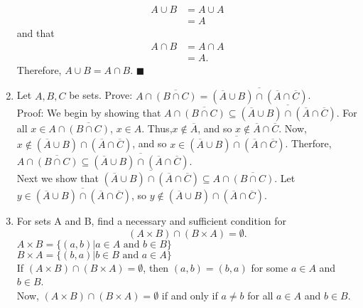 \documentclass[12pt]{article}
\newcommand{\qed}{\(\blacksquare\)}
\begin{document}
\begin{enumerate}
\begin{equation*}
\begin{split}
                A \cup B &= A\cup A\\
                &=A
            \end{split}
        \end{equation*}
        and that 
        \begin{equation*}
            \begin{split}
                A \cap B &= A \cap A\\
                &=A.
            \end{split}
        \end{equation*}
        Therefore, \(A\cup B= A \cap B\). \qed
        \item Let \(A, B, C\) be sets. Prove: \(A\cap\overline{(B\cap C)} = \overline{(\overline{A}\cup B)\cap(\overline{A}\cap\overline{C})}\).\\Proof: We begin by showing that \(A\cap\overline{(B\cap C)}\subseteq \overline{(\overline{A}\cup B)\cap(\overline{A}\cap\overline{C})}\). For all \(x\in A\cap\overline{(B\cap C)}\), \(x\in A\). Thus,\(x\not\in\overline{A}\), and so \(x\not\in \overline{A}\cap\overline{C}\). Now, \(x\not\in(\overline{A}\cup B)\cap(\overline{A}\cap\overline{C}) \), and so \(x\in\overline{(\overline{A}\cup B)\cap(\overline{A}\cap\overline{C})}\). Therfore, \(A\cap\overline{(B\cap C)}\subseteq \overline{(\overline{A}\cup B)\cap(\overline{A}\cap\overline{C})}\). \\ Next we show that \(\overline{(\overline{A}\cup B)\cap(\overline{A}\cap\overline{C})} \subseteq A\cap\overline{(B\cap C)}\). Let \(y\in\overline{(\overline{A}\cup B)\cap(\overline{A}\cap\overline{C})}\), so \(y\not\in(\overline{A}\cup B)\cap(\overline{A}\cap\overline{C})\).
        \item For sets A and B, find a necessary and sufficient condition for
        \begin{equation*}
            (A\times B)\cap(B\times A) = \emptyset.
        \end{equation*}
        \(A\times B =\{(a,b)|a\in A\text{ and }b\in B\}\)\\
        \(B\times A =\{(b,a)|b\in B\text{ and }a\in A\}\)\\
        If \((A\times B)\cap(B\times A) = \emptyset\), then \((a,b)=(b,a)\) for some \(a\in A\) and \(b\in B\).\\
        Now, \((A\times B)\cap(B\times A) = \emptyset\) if and only if \(a\neq b\) for all \(a \in A\) and \(b \in B\). 

\end{enumerate}
\end{document}

